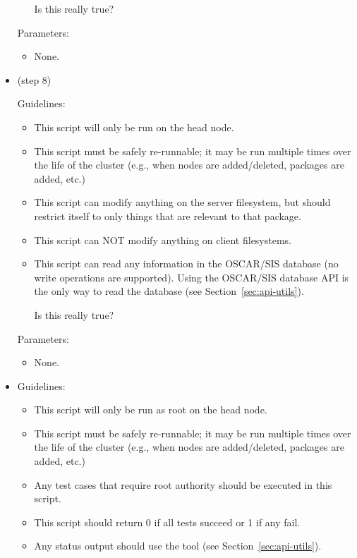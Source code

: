 \begin{itemize}
\begin{itemize}
    \begin{discuss}
      Is this really true?
    \end{discuss}
  \end{itemize}

  Parameters:

  \begin{itemize}
  \item None.
  \end{itemize}
  
\item {} (step 8)

  Guidelines:
  
  \begin{itemize}
  \item This script will only be run on the head node.
  \item This script must be safely re-runnable; it may be run multiple
    times over the life of the cluster (e.g., when nodes are
    added/deleted, packages are added, etc.)
  \item This script can modify anything on the server filesystem, but
    should restrict itself to only things that are relevant to that
    package.
  \item This script can NOT modify anything on client filesystems.
  \item This script can read any information in the OSCAR/SIS database
    (no write operations are supported).  Using the OSCAR/SIS database
    API is the only way to read the database (see
    Section~\ref{sec:api-utils}).

    \begin{discuss}
      Is this really true?
    \end{discuss}
  \end{itemize}

  Parameters:
  
  \begin{itemize}
  \item None.
  \end{itemize}

\item {}

  Guidelines:
  \begin{itemize}
  \item This script will only be run as root on the head node.
  \item This script must be safely re-runnable; it may be run multiple
    times over the life of the cluster (e.g., when nodes are
    added/deleted, packages are added, etc.)
  \item Any test cases that require root authority should be executed
    in this script.
  \item This script should return 0 if all tests succeed or 1 if any
    fail.
  \item Any status output should use the  tool
    (see Section~\ref{sec:api-utils}).
  \end{itemize}


\end{itemize}

